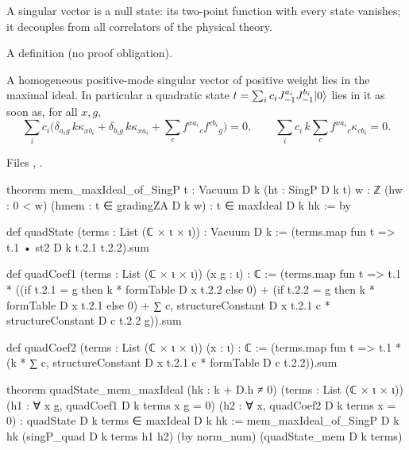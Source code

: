 \begin{physics}
A singular vector is a null state: its two-point function with every state vanishes; it decouples from all correlators of the
physical theory.
\end{physics}

\begin{status}
A definition (no proof obligation).
\end{status}

\begin{theorem}\label{l23:thm:singular}
A homogeneous positive-mode singular vector of positive weight lies in the maximal ideal. In particular a quadratic state
$t=\sum_i c_i J^{a_i}_{-1}J^{b_i}_{-1}|0\rangle$ lies in it as soon as, for all $x,g$,
\begin{equation*}
\sum_i c_i\Big(\delta_{a_i g}\,k\kappa_{x b_i}+\delta_{b_i g}\,k\kappa_{x a_i}+\sum_c f^{x a_i}{}_c f^{c b_i}{}_g\Big)=0,
\qquad
\sum_i c_i\,k\sum_c f^{x a_i}{}_c\kappa_{c b_i}=0 .
\end{equation*}
\end{theorem}
\noindent Files ,
.
\begin{leancode}
theorem mem_maxIdeal_of_SingP {t : Vacuum D k} (ht : SingP D k t)
    {w : ℤ} (hw : 0 < w) (hmem : t ∈ gradingZA D k w) : t ∈ maxIdeal D k hk := by

def quadState (terms : List (ℂ × ι × ι)) : Vacuum D k :=
  (terms.map fun t => t.1 • st2 D k t.2.1 t.2.2).sum

def quadCoef1 (terms : List (ℂ × ι × ι)) (x g : ι) : ℂ :=
  (terms.map fun t => t.1 * ((if t.2.1 = g then k * formTable D x t.2.2 else 0)
    + (if t.2.2 = g then k * formTable D x t.2.1 else 0)
    + ∑ c, structureConstant D x t.2.1 c * structureConstant D c t.2.2 g)).sum

def quadCoef2 (terms : List (ℂ × ι × ι)) (x : ι) : ℂ :=
  (terms.map fun t => t.1 * (k * ∑ c, structureConstant D x t.2.1 c * formTable D c t.2.2)).sum

theorem quadState_mem_maxIdeal (hk : k + D.h ≠ 0) (terms : List (ℂ × ι × ι))
    (h1 : ∀ x g, quadCoef1 D k terms x g = 0) (h2 : ∀ x, quadCoef2 D k terms x = 0) :
    quadState D k terms ∈ maxIdeal D k hk :=
  mem_maxIdeal_of_SingP D k hk (singP_quad D k terms h1 h2) (by norm_num) (quadState_mem D k terms)
\end{leancode}


